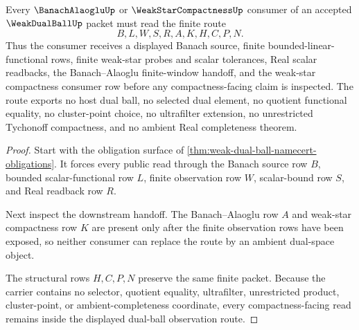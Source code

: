 \begin{theorem}
\label{thm:weak-dual-ball-finite-observation-route}
Every $\BanachAlaogluUp$ or $\WeakStarCompactnessUp$ consumer of an accepted $\WeakDualBallUp$ packet must read the finite route
$$
B,L,W,S,R,A,K,H,C,P,N .
$$
Thus the consumer receives a displayed Banach source, finite bounded-linear-functional rows, finite weak-star probes and scalar tolerances, Real scalar readbacks, the Banach--Alaoglu finite-window handoff, and the weak-star compactness consumer row before any compactness-facing claim is inspected. The route exports no host dual ball, no selected dual element, no quotient functional equality, no cluster-point choice, no ultrafilter extension, no unrestricted Tychonoff compactness, and no ambient Real completeness theorem.
\end{theorem}
\begin{proof}
Start with the obligation surface of \autoref{thm:weak-dual-ball-namecert-obligations}. It forces every public read through the Banach source row $B$, bounded scalar-functional row $L$, finite observation row $W$, scalar-bound row $S$, and Real readback row $R$.

Next inspect the downstream handoff. The Banach--Alaoglu row $A$ and weak-star compactness row $K$ are present only after the finite observation rows have been exposed, so neither consumer can replace the route by an ambient dual-space object.

The structural rows $H,C,P,N$ preserve the same finite packet. Because the carrier contains no selector, quotient equality, ultrafilter, unrestricted product, cluster-point, or ambient-completeness coordinate, every compactness-facing read remains inside the displayed dual-ball observation route.
\end{proof}




